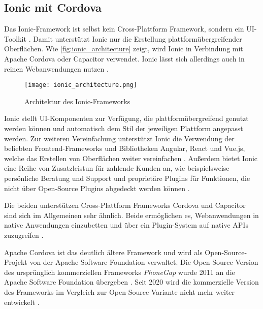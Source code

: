 \subsection{Ionic mit Cordova}
\label{sec:frameworks_ionic}

Das Ionic-Framework ist selbst kein Cross-Plattform Framework, sondern ein UI-Toolkit \cite{Ionic_Docs}.
Damit unterstützt Ionic nur die Erstellung plattformübergreifender Oberflächen.
Wie \autoref{fig:ionic_architecture} zeigt, wird Ionic in Verbindung mit Apache Cordova oder Capacitor verwendet.
Ionic lässt sich allerdings auch in reinen Webanwendungen nutzen \cite{Ionic_Docs}.
\begin{figure}[h]
    \centering
    \texttt{[image: ionic\_architecture.png]}
    \caption{Architektur des Ionic-Frameworks \cite{Ionic_Architektur}}
    \label{fig:ionic_architecture}
\end{figure}


Ionic stellt \ac{UI}-Komponenten zur Verfügung, die plattformübergreifend genutzt werden können und automatisch dem Stil der jeweiligen Plattform angepasst werden.
Zur weiteren Vereinfachung unterstützt Ionic die Verwendung der beliebten Frontend-Frameworks und Bibliotheken Angular, React und Vue.js, welche das Erstellen von Oberflächen weiter vereinfachen \cite{Ionic_Docs, Ionic_EvaluationGuide}.
Außerdem bietet Ionic eine Reihe von Zusatzleistun für zahlende Kunden an, wie beispielsweise persönliche Beratung und Support und proprietäre Plugins für Funktionen, die nicht über Open-Source Plugins abgedeckt werden können \cite{Ionic_EvaluationGuide}.



Die beiden unterstützen Cross-Plattform Frameworks Cordova und Capacitor sind sich im Allgemeinen sehr ähnlich.
Beide ermöglichen es, Webanwendungen in native Anwendungen einzubetten und über ein Plugin-System auf native \acp{API} zuzugreifen \cite{Ionic_Cordova_vs_Capacitor}.


Apache Cordova ist das deutlich ältere Framework und wird als Open-Source-Projekt von der Apache Software Foundation verwaltet.
Die Open-Source Version des ursprünglich kommerziellen Frameworks \textit{PhoneGap} wurde 2011 an die Apache Software Foundation übergeben \cite{Steyer_Cordova}.
Seit 2020 wird die kommerzielle Version des Frameworks im Vergleich zur Open-Source Variante nicht mehr weiter entwickelt \cite{Adobe_PhoneGap_EOL}.


